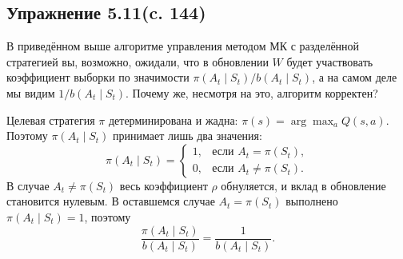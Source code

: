 \subsection{Упражнение 5.11(c. 144)}
В приведённом выше алгоритме управления методом МК с разделённой стратегией вы, возможно, ожидали, что в обновлении $W$ будет участвовать коэффициент выборки по значимости $\pi(A_t \mid S_t) / b(A_t \mid S_t)$, а на самом деле мы видим $1/b(A_t \mid S_t)$. Почему же, несмотря на это, алгоритм корректен?
\begin{solution}
    Целевая стратегия $\pi$ детерминирована и жадна: $\pi(s) = \arg\max_a Q(s, a)$. Поэтому $\pi(A_t \mid S_t)$ принимает лишь два значения:
    \[
    \pi(A_t \mid S_t) = 
    \begin{cases}
        1, & \text{если } A_t = \pi(S_t), \\
        0, & \text{если } A_t \neq \pi(S_t).
    \end{cases}
    \]
    В случае $A_t \neq \pi(S_t)$ весь коэффициент $\rho$ обнуляется, и вклад в обновление становится нулевым. В оставшемся случае $A_t = \pi(S_t)$ выполнено $\pi(A_t \mid S_t) = 1$, поэтому
    \[
    \frac{\pi(A_t \mid S_t)}{b(A_t \mid S_t)} = \frac{1}{b(A_t \mid S_t)}.
    \]
\end{solution}

